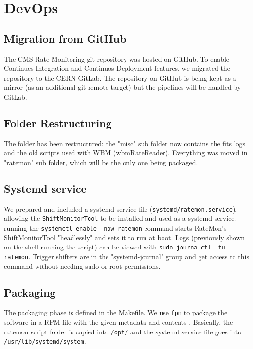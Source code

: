 \section{DevOps}

\subsection{Migration from GitHub}

The CMS Rate Monitoring git repository was hosted on GitHub. To enable Continues Integration and Continuos Deployment features, we migrated the repository to the CERN GitLab. The repository on GitHub is being kept as a mirror (as an additional git remote target) but the pipelines will be handled by GitLab.

\subsection{Folder Restructuring}

The folder has been restructured: the "misc" sub folder now contains the fits logs and the old scripts used with WBM (wbmRateReader). Everything was moved in "ratemon" sub folder, which will be the only one being packaged.

\subsection{Systemd service}

We prepared and included a systemd service file (\texttt{systemd/ratemon.service}), allowing the \texttt{ShiftMonitorTool} to be installed and used as a systemd service: running the \texttt{systemctl enable --now ratemon} command starts RateMon's ShiftMonitorTool "headlessly" and sets it to run at boot. Logs (previously shown on the shell running the script) can be viewed with \texttt{sudo journalctl -fu ratemon}. Trigger shifters are in the "systemd-journal" group and get access to this command without needing sudo or root permissions.


\subsection{Packaging}

The packaging phase is defined in the Makefile. We use \texttt{fpm} \cite{fpm-packager} to package the software in a RPM file with the given metadata and contents \cite{Packaging1MergeRequestsCMSTSGFOGratemonGitLab-2020-10-07}. Basically, the ratemon script folder is copied into \texttt{/opt/} \cite{FilesystemHierarchyStandard-2015-05-20} and the systemd service file goes into \texttt{/usr/lib/systemd/system}.

